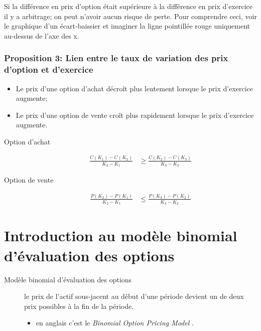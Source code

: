 \documentclass[10pt, french]{article}
\begin{document}
\begin{multicols*}{2}
Si la différence en prix d'option était supérieure à la différence en prix d'exercice il y a arbitrage; on peut n’avoir aucun risque de perte. Pour comprendre ceci, voir le graphique d'un écart-baissier et imaginer la ligne pointillée rouge uniquement au-dessus de l'axe des x.

\subsubsection*{Proposition 3: Lien entre le taux de variation des prix d'option et d'exercice}
\begin{itemize}
	\item	Le prix d'une option d'achat décroît plus lentement lorsque le prix d'exercice augmente;
	\item	Le prix d'une option de vente croît plus rapidement lorsque le prix d'exercice augmente.
\end{itemize}

\begin{description}
	\item[Option d'achat]	
		\begin{align*}
		\frac{C(K_{1}) - C(K_{2})}{K_{2} - K_{1}}
		&\geq	
		\frac{C(K_{2}) - C(K_{3})}{K_{3} - K_{2}}	
		\end{align*}
	\item[Option de vente]	
		\begin{align*}
		\frac{P(K_{2}) - P(K_{1})}{K_{2} - K_{1}}
		&\leq
		\frac{P(K_{3}) - P(K_{2})}{K_{3} - K_{2}}	
		\end{align*}
\end{description}


\newpage

\section{Introduction au modèle binomial d'évaluation des options}

\begin{description}
	\item[Modèle binomial d'évaluation des options]	le prix de l'actif sous-jacent au début d'une période devient un de deux prix possibles à la fin de la période.
		\begin{itemize}[leftmargin = *]
		\item	en anglais c'est le \og \textit{Binomial Option Pricing Model} \fg{}.
		\end{itemize}
\end{description}


\end{multicols*}
\end{document}
